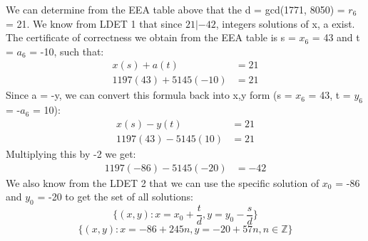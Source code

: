 \documentclass[11pt]{article}
\begin{document}
We can determine from the EEA table above that the d = gcd(1771, 8050) = $ r_6$ = 21. We know from LDET 1 that since $21|-42$, integers solutions of x, a exist. The certificate of correctness we obtain from the EEA table is s = $x_6$ = 43 and t = $a_6$ = -10, such that:
\begin{align*}
x(s)+ a(t) & = 21\\
1197 (43) + 5145 (-10) & = 21
\end{align*}
Since a = -y, we can convert this formula back into x,y form (s = $x_6$ = 43, t = $y_6$ = -$a_6$ = 10):
\begin{align*}
x(s) -  y(t) & = 21\\
1197 (43) - 5145 (10)  &= 21
\end{align*}
Multiplying this by -2 we get:
\begin{align*}
1197 (-86) - 5145 (-20)  &= -42
\end{align*}
We also know from the LDET 2 that we can use the specific solution of $x_0$ = -86 and $y_0$ = -20 to get the set of all solutions:
\[ \{ (x,y): x =  x_0 + \frac{t}{d}, y = y_0 - \frac{s}{d} \} \]
\[ \{ (x,y): x =  -86 + 245n, y = -20 + 57n, n \in \mathbb{Z} \} \]
\end{document}
